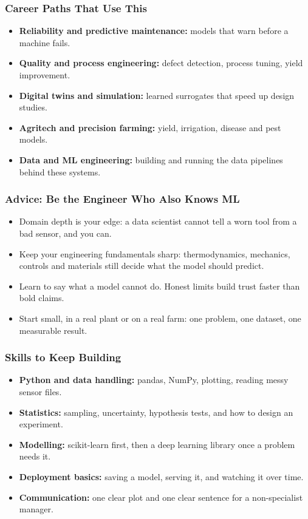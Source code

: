 \begin{frame}[fragile]\frametitle{Career Paths That Use This}
\begin{itemize}
\item \textbf{Reliability and predictive maintenance:} models that warn before a machine fails.
\item \textbf{Quality and process engineering:} defect detection, process tuning, yield improvement.
\item \textbf{Digital twins and simulation:} learned surrogates that speed up design studies.
\item \textbf{Agritech and precision farming:} yield, irrigation, disease and pest models.
\item \textbf{Data and ML engineering:} building and running the data pipelines behind these systems.
\end{itemize}
\end{frame}

\begin{frame}[fragile]\frametitle{Advice: Be the Engineer Who Also Knows ML}
\begin{itemize}
\item Domain depth is your edge: a data scientist cannot tell a worn tool from a bad sensor, and you can.
\item Keep your engineering fundamentals sharp: thermodynamics, mechanics, controls and materials still decide what the model should predict.
\item Learn to say what a model cannot do. Honest limits build trust faster than bold claims.
\item Start small, in a real plant or on a real farm: one problem, one dataset, one measurable result.
\end{itemize}
\end{frame}

\begin{frame}[fragile]\frametitle{Skills to Keep Building}
\begin{itemize}
\item \textbf{Python and data handling:} pandas, NumPy, plotting, reading messy sensor files.
\item \textbf{Statistics:} sampling, uncertainty, hypothesis tests, and how to design an experiment.
\item \textbf{Modelling:} scikit-learn first, then a deep learning library once a problem needs it.
\item \textbf{Deployment basics:} saving a model, serving it, and watching it over time.
\item \textbf{Communication:} one clear plot and one clear sentence for a non-specialist manager.
\end{itemize}
\end{frame}

